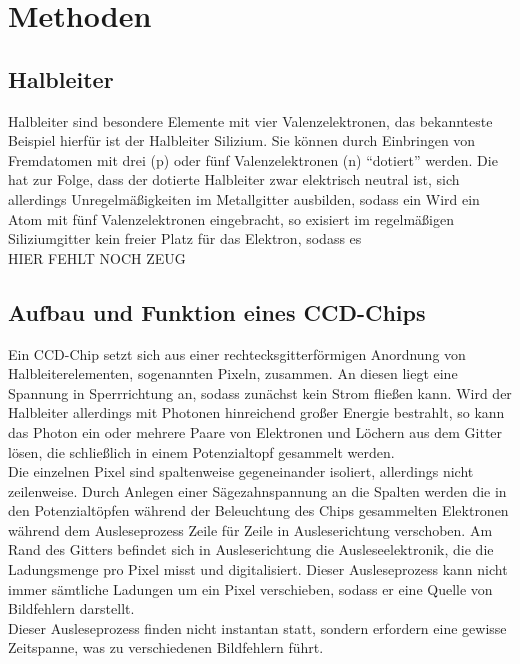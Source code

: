 \section{Methoden}
\subsection{Halbleiter}
Halbleiter sind besondere Elemente mit vier Valenzelektronen, das bekannteste Beispiel hierfür ist der Halbleiter Silizium. Sie können durch Einbringen von Fremdatomen mit drei (p) oder fünf Valenzelektronen (n)  \enquote{dotiert} werden. Die hat zur Folge, dass der dotierte Halbleiter zwar elektrisch neutral ist, sich allerdings Unregelmäßigkeiten im Metallgitter ausbilden, sodass ein
Wird ein Atom mit fünf Valenzelektronen eingebracht, so exisiert im regelmäßigen Siliziumgitter kein freier Platz für das Elektron, sodass es \\
HIER FEHLT NOCH ZEUG

\subsection{Aufbau und Funktion eines CCD-Chips}
Ein CCD-Chip setzt sich aus einer rechtecksgitterförmigen Anordnung von Halbleiterelementen, sogenannten Pixeln, zusammen. An diesen liegt eine Spannung in Sperrrichtung an, sodass zunächst kein Strom fließen kann. Wird der Halbleiter allerdings mit Photonen hinreichend großer Energie bestrahlt, so kann das Photon ein oder mehrere Paare von Elektronen und Löchern aus dem Gitter lösen, die schließlich in einem Potenzialtopf gesammelt werden. \\
Die einzelnen Pixel sind spaltenweise gegeneinander isoliert, allerdings nicht zeilenweise. Durch Anlegen einer Sägezahnspannung an die Spalten werden die in den Potenzialtöpfen während der Beleuchtung des Chips gesammelten Elektronen während dem Ausleseprozess Zeile für Zeile in Ausleserichtung verschoben. Am Rand des Gitters befindet sich in Ausleserichtung die Ausleseelektronik, die die Ladungsmenge pro Pixel misst und digitalisiert. Dieser Ausleseprozess kann nicht immer sämtliche Ladungen um ein Pixel verschieben, sodass er eine Quelle von Bildfehlern darstellt. \\
Dieser Ausleseprozess finden nicht instantan statt, sondern erfordern eine gewisse Zeitspanne, was zu verschiedenen Bildfehlern führt. 


